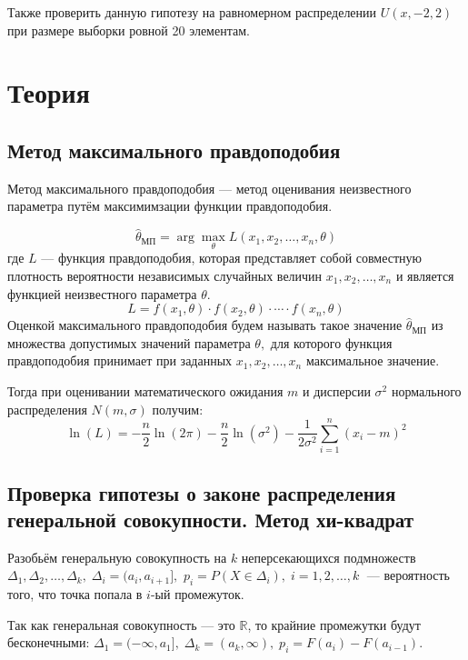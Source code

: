 \documentclass[12pt,a4paper]{article}
\begin{document}
	Также проверить данную гипотезу на равномерном распределении $U(x, -2, 2)$ при размере выборки ровной 20 элементам.
	\section{Теория}
	\subsection{Метод максимального правдоподобия}
	Метод максимального правдоподобия --- метод оценивания неизвестного параметра путём максимимзации функции правдоподобия.
	
	\begin{equation}
	\hat{\theta}_{\text{МП}} = \arg \max_\theta L(x_1,x_2,\ldots,x_n,\theta)
	\end{equation}
	где $L$ --- функция правдоподобия, которая представляет собой совместную плотность вероятности независимых случайных величин $x_1,x_2,\ldots,x_n$ и является функцией неизвестного параметра $\theta$.
	\begin{equation}
	L = f(x_1,\theta)\cdot f(x_2,\theta)\cdot\cdots\cdot f(x_n,\theta)
	\end{equation}
	Оценкой максимального правдоподобия будем называть такое значение $\hat{\theta}_{\text{МП}}$ из множества допустимых значений параметра $\theta,$ для которого функция правдоподобия принимает при заданных $x_1, x_2, \ldots, x_n$ максимальное значение.
	
	Тогда при оценивании математического ожидания $m$ и дисперсии $\sigma^2$ нормального распределения $N(m,\sigma)$ получим:
	\begin{equation}
	\ln(L)=-\frac{n}{2}\ln(2\pi)-\frac{n}{2}\ln\left(\sigma^2\right)-\frac{1}{2\sigma^2}\sum\limits_{i=1}^n(x_i-m)^2
	\end{equation}
	
	\subsection{Проверка гипотезы о законе распределения генеральной совокупности. Метод хи-квадрат}
	Разобьём генеральную совокупность на $k$ неперсекающихся подмножеств $\Delta_1, \Delta_2,\ldots, \Delta_k,\;\Delta_i = (a_i,a_{i+1}],$ $p_i = P(X\in\Delta_i),\;i=1,2,\ldots,k\;$ --- вероятность того, что точка попала в $i$-ый промежуток.
	
	Так как генеральная совокупность --- это $\mathbb{R}$, то крайние промежутки будут бесконечными: $\Delta_1 = (-\infty,a_1], \;\Delta_k = (a_k,\infty), \;p_i = F(a_i) - F(a_{i-1})$.
	
\end{document}
